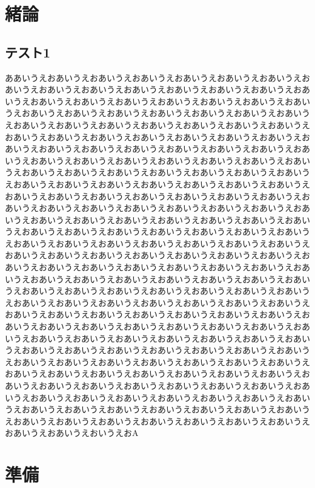 \documentclass[a4paper,12pt]{jreport}
\begin{document}
\chapter{緒論}
\section{テスト1}
ああいうえおあいうえおあいうえおあいうえおあいうえおあいうえおあいうえおあいうえおあいうえおあいうえおあいうえおあいうえおあいうえおあいうえおあいうえおあいうえおあいうえおあいうえおあいうえおあいうえおあいうえおあいうえおあいうえおあいうえおあいうえおあいうえおあいうえおあいうえおあいうえおあいうえおあいうえおあいうえおあいうえおあいうえおあいうえおあいうえおあいうえおあいうえおあいうえおあいうえおあいうえおあいうえおあいうえおあいうえおあいうえおあいうえおあいうえおあいうえおあいうえおあいうえおあいうえおあいうえおあいうえおあいうえおあいうえおあいうえおあいうえおあいうえおあいうえおあいうえおあいうえおあいうえおあいうえおあいうえおあいうえおあいうえおあいうえおあいうえおあいうえおあいうえおあいうえおあいうえおあいうえおあいうえおあいうえおあいうえおあいうえおあいうえおあいうえおあいうえおあいうえおあいうえおあいうえおあいうえおあいうえおあいうえおあいうえおあいうえおあいうえおあいうえおあいうえおあいうえおあいうえおあいうえおあいうえおあいうえおあいうえおあいうえおあいうえおあいうえおあいうえおあいうえおあいうえおあいうえおあいうえおあいうえおあいうえおあいうえおあいうえおあいうえおあいうえおあいうえおあいうえおあいうえおあいうえおあいうえおあいうえおあいうえおあいうえおあいうえおあいうえおあいうえおあいうえおあいうえおあいうえおあいうえおあいうえおあいうえおあいうえおあいうえおあいうえおあいうえおあいうえおあいうえおあいうえおあいうえおあいうえおあいうえおあいうえおあいうえおあいうえおあいうえおあいうえおあいうえおあいうえおあいうえおあいうえおあいうえおあいうえおあいうえおあいうえおあいうえおあいうえおあいうえおあいうえおあいうえおあいうえおあいうえおあいうえおあいうえおあいうえおあいうえおあいうえおあいうえおあいうえおあいうえおあいうえおあいうえおあいうえおあいうえおあいうえおあいうえおあいうえおあいうえおあいうえおあいうえおあいうえおあいうえおあいうえおあいうえおあいうえおあいうえおあいうえおあいうえおあいうえおあいうえおあいうえおあいうえおあいうえおあいうえおあいうえおあいうえおあいうえおあいうえおあいうえおあいうえおあいうえおあいうえおあいうえおあいうえおあいうえおあいうえおあいうえおあいうえおあいうえおあいうえおあいうえおあいうえおあいうえおあいうえおあいうえおあいうえおあいうえおあいうえおあいうえおあいうえおあいうえおあいうえおいうえおA

\chapter{準備}
\end{document}
